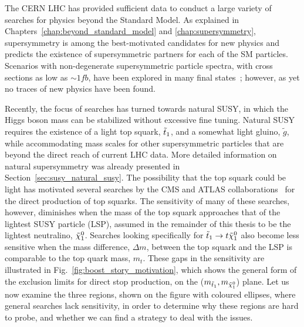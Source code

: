 

The CERN LHC has provided sufficient data to conduct a large variety of
searches for physics beyond the Standard Model.
As explained in Chapters~\ref{chap:beyond_standard_model} and \ref{chap:supersymmetry},
supersymmetry is among the best-motivated candidates for new physics and predicts the existence of
supersymmetric partners for each of the SM particles.  
Scenarios with non-degenerate supersymmetric particle spectra, with cross sections as low as
${\sim}1\unit{fb}$, have been explored in many final states~\cite{CMS-PAS-SUS-13-020}; however, as
yet no
traces of new physics have been found.  

Recently, the focus of searches has turned towards natural SUSY, in which the Higgs boson mass can
be stabilized without excessive fine tuning. Natural SUSY requires the existence of a light top
squark, $\tilde{t}_1$, and a somewhat light gluino, $\tilde{g}$, while accommodating mass scales for
other supersymmetric particles that are beyond the direct reach of current LHC data.  
More detailed information on natural supersymmetry was already presented in
Section~\ref{sec:susy_natural_susy}. 
The possibility that the top squark could be light has motivated several searches by the CMS and
ATLAS
collaborations~\cite{Aad:2013ija,Aad:2014qaa,Aad:2014bva,Aad:2014kva,Aad:2014kra,Chatrchyan:2013xna,
Chatrchyan:2013mya,Khachatryan:2014doa} for the direct production of top squarks. The sensitivity of
many of these searches, however, diminishes when the mass of the top squark approaches that of the
lightest SUSY particle (LSP), assumed in the remainder of this thesis to be the lightest neutralino,
$\tilde{\chi}_1^0$. Searches looking specifically for $\tilde{t}_1 \rightarrow t \tilde{\chi}_1^0$ also become less sensitive
when the mass difference, $\Delta m$, between the top squark and the LSP is comparable to the top
quark mass, $m_t$. 
These gaps in the sensitivity are illustrated in Fig.~\ref{fig:boost_story_motivation}, which shows
the general form of the exclusion limits for direct stop production, on the
($m_{\tilde{t}_1},m_{\tilde{\chi}_1^0}$) plane. 
Let us now examine the three regions, shown on the figure with coloured ellipses, where general
searches lack sensitivity, in order to determine why these regions are hard to probe, and whether we
can find a strategy to deal with the issues. 

